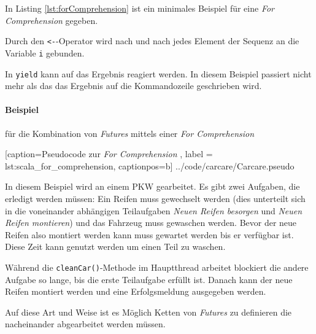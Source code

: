 In Listing \ref{lst:forComprehension} ist ein minimales Beispiel für
eine \emph{For Comprehension} gegeben.

Durch den \texttt{<-}-Operator wird nach und nach jedes Element
der Sequenz an die Variable \texttt{i} gebunden.

In \texttt{yield} kann auf das Ergebnis reagiert werden. In diesem
Beispiel passiert nicht mehr als das das Ergebnis auf die Kommandozeile
geschrieben wird.

\paragraph{Beispiel} für die Kombination von \emph{Futures} mittels
einer \emph{For Comprehension}


    [caption={Pseudocode zur \emph{For Comprehension} },
       label = lst:scala_for_comprehension,
       captionpos=b]
 {../code/carcare/Carcare.pseudo}
 
In diesem Beispiel wird an einem PKW gearbeitet. Es gibt zwei
Aufgaben, die erledigt werden müssen: Ein Reifen muss gewechselt werden
(dies unterteilt sich in die voneinander abhängigen Teilaufgaben
\emph{Neuen Reifen besorgen} und \emph{Neuen Reifen montieren}) und
das Fahrzeug muss gewaschen werden. Bevor der neue Reifen also montiert
werden kann muss gewartet werden bis er verfügbar ist. Diese Zeit
kann genutzt werden um einen Teil zu waschen.

Während die \texttt{cleanCar()}-Methode im Hauptthread arbeitet
blockiert die andere Aufgabe so lange, bis die erste Teilaufgabe
erfüllt ist. Danach kann der neue Reifen montiert werden und
eine Erfolgsmeldung ausgegeben werden.

Auf diese Art und Weise ist es Möglich Ketten von \emph{Futures}
zu definieren die nacheinander abgearbeitet werden müssen.
